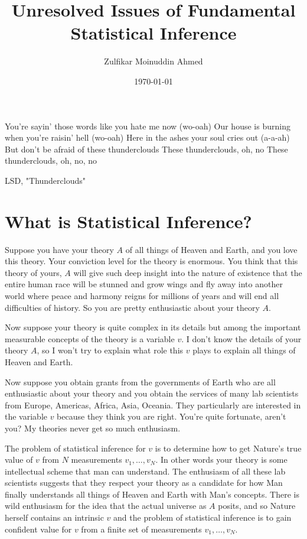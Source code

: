 \documentclass{amsart}
\title{Unresolved Issues of Fundamental Statistical Inference}
\author{Zulfikar Moinuddin Ahmed}
\date{\today}
\begin{document}
\maketitle
\epigraph{You're sayin' those words like you hate me now (wo-oah)
Our house is burning when you're raisin' hell (wo-oah)
Here in the ashes your soul cries out (a-a-ah)
But don't be afraid of these thunderclouds
These thunderclouds, oh, no
These thunderclouds, oh, no, no}{LSD, "Thunderclouds"}

\section{What is Statistical Inference?}

Suppose you have your theory $A$ of all things of Heaven and Earth, and you love this theory.  Your conviction level for the theory is enormous.  You think that this theory of yours, $A$ will give such deep insight into the nature of existence that the entire human race will be stunned and grow wings and fly away into another world where peace and harmony reigns for millions of years and will end all difficulties of history.  So you are pretty enthusiastic about your theory $A$.

Now suppose your theory is quite complex in its details but among the important measurable concepts of the theory is a variable $v$.  I don't know the details of your theory $A$, so I won't try to explain what role this $v$ plays to explain all things of Heaven and Earth.

Now suppose you obtain grants from the governments of Earth who are all enthusiastic about your theory and you obtain the services of many lab scientists from Europe, Americas, Africa, Asia, Oceania.  They particularly are interested in the variable $v$ because they think you are right.  You're quite fortunate, aren't you?  My theories never get so much enthusiasm. 

The problem of statistical inference for $v$ is to determine how to get Nature's true value of $v$ from $N$ measurements $v_1,\dots,v_N$.  In other words your theory is some intellectual scheme  that man can understand.  The enthusiasm of all these lab scientists suggests that they respect your theory as a candidate for how Man finally understands all things of Heaven and Earth with Man's concepts.   There is wild enthusiasm for the idea that the actual universe as $A$ posits, and so Nature herself contains an intrinsic $v$ and the problem of statistical inference is to gain confident value for $v$ from a finite set of measurements $v_1,\dots, v_N$.
\end{document}
